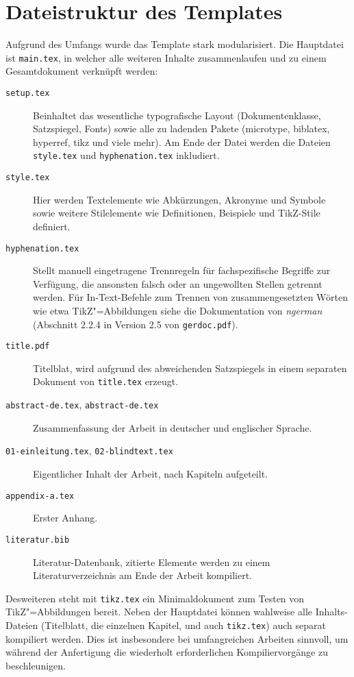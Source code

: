 \section{Dateistruktur des Templates}\label{sec:struktur}
%
Aufgrund des Umfangs wurde das Template stark modularisiert. Die Hauptdatei ist \texttt{main.tex}, in welcher alle weiteren Inhalte zusammenlaufen und zu einem Gesamtdokument verknüpft werden:
%
\begin{description}
  \item[\texttt{setup.tex}] Beinhaltet das wesentliche typografische Layout (Dokumentenklasse, Satzspiegel, Fonts) sowie alle zu ladenden Pakete (microtype, biblatex, hyperref, tikz und viele mehr). Am Ende der Datei werden die Dateien \texttt{style.tex} und \texttt{hyphenation.tex} inkludiert.
  \item[\texttt{style.tex}] Hier werden Textelemente wie Abkürzungen, Akronyme und Symbole sowie weitere Stilelemente wie Definitionen, Beispiele und TikZ-Stile definiert.
  \item[\texttt{hyphenation.tex}] Stellt manuell eingetragene Trennregeln für fachspezifische Begriffe zur Verfügung, die ansonsten falsch oder an ungewollten Stellen getrennt werden. Für In-Text-Befehle zum Trennen von zusammengesetzten Wörten wie etwa TikZ"=Abbildungen siehe die Dokumentation von \emph{ngerman} (Abschnitt 2.2.4 in Version 2.5 von \texttt{gerdoc.pdf}).
  \item[\texttt{title.pdf}] Titelblat, wird aufgrund des abweichenden Satzspiegels in einem separaten Dokument von \texttt{title.tex} erzeugt.
  \item[\texttt{abstract-de.tex}, \texttt{abstract-de.tex}] Zusammenfassung der Arbeit in deutscher und englischer Sprache.
  \item[\texttt{01-einleitung.tex}, \texttt{02-blindtext.tex}] Eigentlicher Inhalt der Arbeit, nach Kapiteln aufgeteilt.
  \item[\texttt{appendix-a.tex}] Erster Anhang.
  \item[\texttt{literatur.bib}] Literatur-Datenbank, zitierte Elemente werden zu einem Literaturverzeichnis am Ende der Arbeit kompiliert.
\end{description}
%
Desweiteren steht mit \texttt{tikz.tex} ein Minimaldokument zum Testen von TikZ"=Abbildungen bereit. Neben der Hauptdatei können wahlweise alle Inhalts-Dateien (Titelblatt, die einzelnen Kapitel, und auch \texttt{tikz.tex}) auch separat kompiliert werden. Dies ist insbesondere bei umfangreichen Arbeiten sinnvoll, um während der Anfertigung die wiederholt erforderlichen Kompiliervorgänge zu beschleunigen.
%
%
